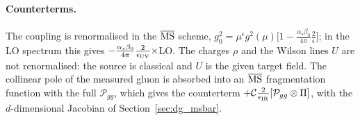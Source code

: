 \paragraph{Counterterms.} The coupling is renormalised in the $\overline{\rm MS}$ scheme, $g_0^2=\mu^\epsilon g^2(\mu)\big[1-\frac{\alpha_s\beta_0}{4\pi}\frac2\epsilon\big]$; in the LO spectrum this gives $-\frac{\alpha_s\beta_0}{4\pi}\frac{2}{\epsilon_{\rm UV}}\times$LO. The charges $\rho$ and the Wilson lines $U$ are not renormalised: the source is classical and $U$ is the given target field. The collinear pole of the measured gluon is absorbed into an $\overline{\rm MS}$ fragmentation function with the full $\mathcal P_{gg}$, which gives the counterterm $+\mathcal C\frac{2}{\epsilon_{\rm IR}}[\mathcal P_{gg}\otimes\Pi]$, with the $d$-dimensional Jacobian of Section~\ref{sec:dg_msbar}.

